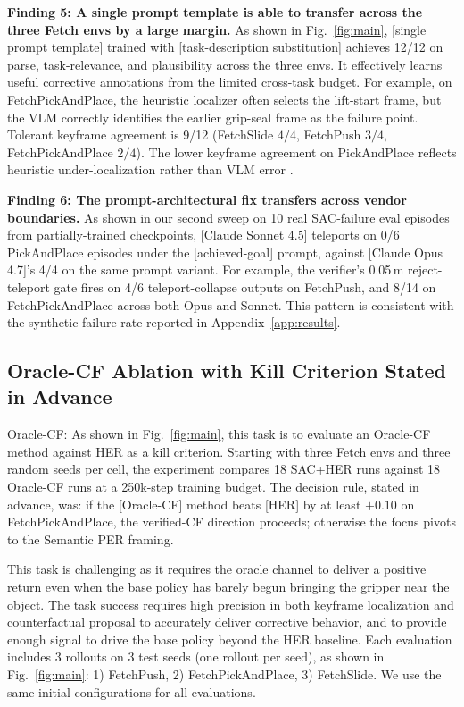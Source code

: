 \documentclass{article}
\begin{document}
\textbf{Finding 5: A single prompt template is able to transfer
across the three Fetch envs by a large margin.}
As shown in Fig.~\ref{fig:main}, [single prompt template] trained
with [task-description substitution] achieves 12/12 on parse,
task-relevance, and plausibility across the three envs. It
effectively learns useful corrective annotations from the limited
cross-task budget. For example, on FetchPickAndPlace, the heuristic
localizer often selects the lift-start frame, but the VLM correctly
identifies the earlier grip-seal frame as the failure point.
Tolerant keyframe agreement is 9/12 (FetchSlide $4/4$, FetchPush
$3/4$, FetchPickAndPlace $2/4$). The lower keyframe agreement on
PickAndPlace reflects heuristic under-localization rather than VLM
error \citep{sayar2023cebp}.

\textbf{Finding 6: The prompt-architectural fix transfers across
vendor boundaries.}
As shown in our second sweep on 10 real SAC-failure eval episodes
from partially-trained checkpoints, [Claude Sonnet 4.5] teleports
on 0/6 PickAndPlace episodes under the [achieved-goal] prompt,
against [Claude Opus 4.7]'s 4/4 on the same prompt variant. For
example, the verifier's 0.05\,m reject-teleport gate fires on 4/6
teleport-collapse outputs on FetchPush, and 8/14 on
FetchPickAndPlace across both Opus and Sonnet. This pattern is
consistent with the synthetic-failure rate reported in
Appendix~\ref{app:results}.

\subsection{Oracle-CF Ablation with Kill Criterion Stated in Advance}
\label{sec:exp:kill}

Oracle-CF: As shown in Fig.~\ref{fig:main}, this task is to evaluate
an Oracle-CF method against HER as a kill criterion. Starting with
three Fetch envs and three random seeds per cell, the experiment
compares 18 SAC+HER runs against 18 Oracle-CF runs at a 250k-step
training budget. The decision rule, stated in advance, was: if the
[Oracle-CF] method beats [HER] by at least $+0.10$ on
FetchPickAndPlace, the verified-CF direction proceeds; otherwise
the focus pivots to the Semantic PER framing.

This task is challenging as it requires the oracle channel to
deliver a positive return even when the base policy has barely
begun bringing the gripper near the object. The task success
requires high precision in both keyframe localization and
counterfactual proposal to accurately deliver corrective behavior,
and to provide enough signal to drive the base policy beyond the
HER baseline. Each evaluation includes 3 rollouts on 3 test seeds
(one rollout per seed), as shown in Fig.~\ref{fig:main}: 1)
FetchPush, 2) FetchPickAndPlace, 3) FetchSlide. We use the same
initial configurations for all evaluations.
\end{document}

